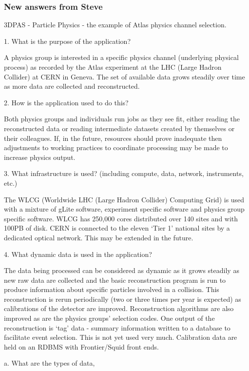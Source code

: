\documentclass[preprint,12pt]{article}
\begin{document}
\subsubsection{New answers from Steve}

3DPAS - Particle Physics - the example of Atlas physics channel selection.

   1.     What is the purpose of the application?

A physics group is interested in a specific physics channel (underlying physical process) as recorded by the Atlas experiment at the LHC (Large Hadron Collider) at CERN in Geneva. The set of available data grows steadily over time as more data are collected and reconstructed.

   2.    How is the application used to do this?

 Both physics groups and individuals run jobs as they see fit, either reading the reconstructed data or reading intermediate datasets created by themselves or their colleagues. If, in the future, resources should prove inadequate then adjustments to working practices to coordinate processing may be made to increase physics output.

   3.      What infrastructure is used? (including compute, data, network, instruments, etc.)

The WLCG (Worldwide LHC (Large Hadron Collider) Computing Grid) is used with a mixture of gLite software, experiment specific software and physics group specific software. WLCG has 250,000 cores distributed over 140 sites and with 100PB of disk. CERN is connected to the eleven `Tier 1' national sites by a dedicated optical network. This may be extended in the future.

   4.      What dynamic data is used in the application?

The data being processed can be considered as dynamic as it grows steadily as new raw data are collected and the basic reconstruction program is run to produce information about specific particles involved in a collision. This reconstruction is rerun periodically (two or three times per year is expected) as calibrations of the detector are improved. Reconstruction algorithms are also improved as are the physics groups' selection codes. One output of the reconstruction is `tag' data - summary information written to a database to facilitate event selection. This is not yet used very much. Calibration data are held on an RDBMS with Frontier/Squid front ends.

         a.             What are the types of data,
\end{document}
